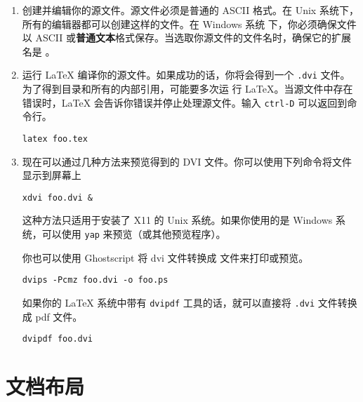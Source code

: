 \begin{enumerate}
\item

  创建并编辑你的源文件。源文件必须是普通的 ASCII 格式。在 Unix 系统下，所有的编辑器都可以创建这样的文件。在 Windows 系统
  下，你必须确保文件以 ASCII 或\textbf{普通文本}格式保存。当选取你源文件的文件名时，确保它的扩展名是 。

\item

运行 \LaTeX{} 编译你的源文件。如果成功的话，你将会得到一个 \texttt{.dvi} 文件。为了得到目录和所有的内部引用，可能要多次运
行 \LaTeX{}。当源文件中存在错误时，\LaTeX{} 会告诉你错误并停止处理源文件。输入 \texttt{ctrl-D} 可以返回到命令行。
\begin{lscommand}
\verb+latex foo.tex+
\end{lscommand}

\item
现在可以通过几种方法来预览得到的 DVI 文件。你可以使用下列命令将文件显示到屏幕上
\begin{lscommand}
\verb+xdvi foo.dvi &+
\end{lscommand}
这种方法只适用于安装了 X11 的 Unix 系统。如果你使用的是 Windows 系统，可以使用 \texttt{yap} 来预览（或其他预览程序）。

你也可以使用 Ghostscript 将 dvi 文件转换成 \PSi{} 文件来打印或预览。
\begin{lscommand}
\verb+dvips -Pcmz foo.dvi -o foo.ps+
\end{lscommand}

如果你的 \LaTeX{} 系统中带有 \texttt{dvipdf} 工具的话，就可以直接将 \texttt{.dvi} 文件转换成 pdf 文件。
\begin{lscommand}
\verb+dvipdf foo.dvi+
\end{lscommand}

\end{enumerate}

\section{文档布局}

